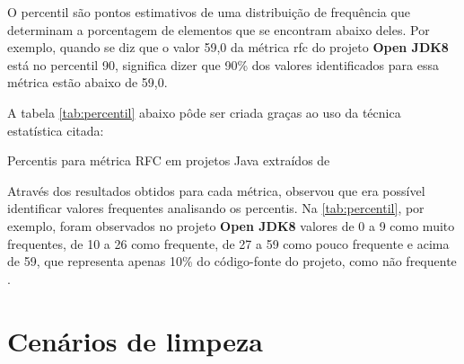 O percentil são pontos estimativos de uma distribuição de frequência que determinam a porcentagem de elementos que se encontram abaixo deles. Por exemplo, quando se diz que o valor 59,0 da métrica rfc do projeto \textbf{Open JDK8} está no percentil 90, significa dizer que 90\% dos valores identificados para essa métrica estão abaixo de 59,0. 

A tabela \ref{tab:percentil} abaixo pôde ser criada graças ao uso da técnica estatística citada:
	
	\begin{table}[!ht]
	\begin{center}
	
	 
	\caption{Percentis para métrica RFC em projetos Java extraídos de  
	}
	\label{tab:percentil}
	\end{center}
	\end{table}	
	\FloatBarrier	

Através dos resultados obtidos para cada métrica,  observou que era possível identificar valores frequentes analisando os percentis. Na \ref{tab:percentil}, por exemplo, foram observados no projeto \textbf{Open JDK8} valores de 0 a 9 como muito frequentes, de 10 a 26 como frequente, de 27 a 59 como pouco frequente e acima de 59, que representa apenas 10\% do código-fonte do projeto, como não frequente \cite{Meirelles2013}.


   


\section{Cenários de limpeza} 